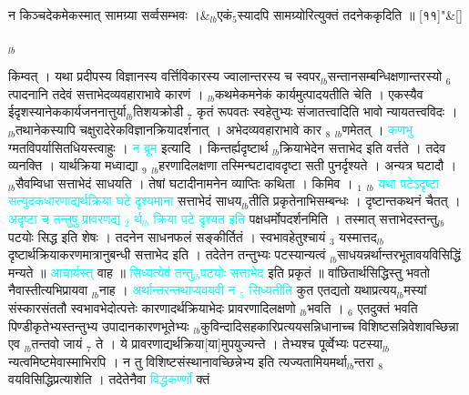 \documentclass[article,12pt,a4paper]{memoir}%
\newcommand{\quotelemma}[1]{\textcolor{cyan}{#1}}
\begin{document}
	    
	    \stanza[\smallbreak]
	  न किञ्चदेकमेकस्मात् सामग्र्या सर्व्वसम्भवः ।&{\tiny $_{lb}$}एकं{\tiny $_{5}$}स्यादपि सामग्र्योरित्युक्तं तदनेककृदिति ॥ [११]{\normalfontlatin\large\qquad{}"}\&[\smallbreak]
	  
	  
	  
	  \endgroup
	{\tiny $_{lb}$}

	  
	  \pstart \leavevmode%
	किम्वत् । यथा प्रदीपस्य विज्ञानस्य वर्त्तिविकारस्य ज्वालान्तरस्य च स्वपर{\tiny $_{lb}$}सन्तानसम्बन्धिक्षणान्तरस्यो {\tiny $_{6}$} त्पादनानि तदेवं सत्ताभेदव्यवहाराभावे कारणं । {\tiny $_{lb}$}कथमेकमनेकं कार्यमुत्पादयतीति चेति । एकस्यैव ईदृशस्यानेककार्यजननात्तुर्या{\tiny $_{lb}$}तिशयक्रोडी {\tiny $_{7}$} कृतं रूपवतः स्वहेतुभ्यः संजातत्त्वादिति भावो न्यायतत्त्वविदः । {\tiny $_{lb}$}तथानेकस्यापि चक्षुरादेरेकविज्ञानक्रियादर्शनात् । अभेदव्यवहाराभावे कार {\tiny $_{8}$} {\tiny $_{lb}$}णमेतत् । \quotelemma{कणभु} ग्मतविपर्यासितधियस्त्वाहुः । \quotelemma{न ब्रूम} इत्यादि । किन्तर्ह्यदृष्टार्थ {\tiny $_{lb}$}क्रियाभेदेन सत्ताभेद इति वर्त्तते । तदेव व्यनक्ति । यार्थक्रिया \cite[3b6]{vn-msN} मध्वाद्या {\tiny $_{9}$} \leavevmode{} {\tiny $_{lb}$}हरणादिलक्षणा तस्मिन्घटादावदृष्टा सती पुनर्दृश्यते । अन्यत्र घटादौ । {\tiny $_{lb}$}सैवम्विधा सत्ताभेदं साधयति । तेषां घटादीनामनेन व्याप्तिः कथिता । किमिव । {\tiny $_{1}$} {\tiny $_{lb}$} \quotelemma{यथा पटेऽदृष्टा सत्युदकधारणाद्यर्थक्रिया घटे दृश्यमाना} \cite[3b7]{vn-msN} सत्ताभेदं साधय{\tiny $_{lb}$}तीति प्रकृतेनाभिसम्बन्धः । दृष्टान्तकथनं चैतत् । \quotelemma{अदृष्टा च तन्तुषु प्रावरणद्य {\tiny $_{2}$} र्थ{\tiny $_{lb}$}\leavevmode\ledsidenote{\textenglish{40/s}} क्रिया पटे दृश्यत इति} \cite[3b7]{vn-msN} पक्षधर्मोपदर्शनमिति । तस्मात् सत्ताभेदस्तन्तु{\tiny $_{lb}$}पटयोः सिद्ध इति शेषः । तदनेन साधनफलं सङ्कीर्तितं । स्वभावहेतुश्चायं {\tiny $_{3}$} यस्मात्तद{\tiny $_{lb}$}दृष्टार्थक्रियाकरणमात्रानुबन्धी सत्ताभेद इति । तदेतेन तन्तुभ्यः पटस्यान्यत्वं {\tiny $_{lb}$}साधयन्नर्थान्तरभूतावयविसिद्धिं मन्यते ॥ \quotelemma{आचार्यस्त्} वाह ॥ \quotelemma{सिध्यत्येवं तन्तु{\tiny $_{lb}$}पटयोः सत्ताभेद} इति प्रकृतं ॥ वांछितार्थसिद्धिस्तु भवतो नैवास्तीत्यभिप्रायवा {\tiny $_{lb}$}नाह । \quotelemma{अर्थान्तरन्तथाप्यवयवी न {\tiny $_{5}$} सिध्यतीति} \cite[3b7]{vn-msN} कुत एतद्यतो यथाप्रत्यय{\tiny $_{lb}$}मस्यां संस्कारसंततौ स्वभावभेदोत्पत्तेः कारणादर्थक्रियाभेदः प्रावरणादिलक्षणो {\tiny $_{lb}$}भवति । {\tiny $_{6}$} एतदुक्तं भवति पिण्डीकृतेभ्यस्तन्तुभ्य उपादानकारणभूतेभ्यः {\tiny $_{lb}$}कुविन्दादिसहकारिप्रत्ययसन्निधानाच्च विशिष्टसन्निवेशावच्छिन्ना एव {\tiny $_{lb}$}तन्तवो जायं {\tiny $_{7}$} ते । ये प्रावरणाद्यर्थक्रिया[या]मुपयुज्यन्ते । तेभ्यश्च पूर्व्वेभ्यः पटस्या{\tiny $_{lb}$}न्यत्वमिष्टमेवास्माभिरपि । न तु विशिष्टसंस्थानावच्छिन्नेभ्य इति त्यज्यतामियमर्था{\tiny $_{lb}$}न्तरा {\tiny $_{8}$} \leavevmode{} वयविसिद्धिप्रत्याशेति । तदेतेनैवा \quotelemma{विद्धकर्ण्णो} क्तं 
\end{document}
